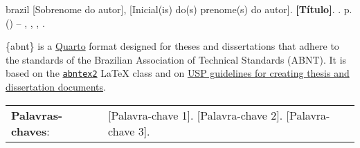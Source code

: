 \begin{resumoenv}[\resumoestrangeironame]
\begin{otherlanguage*}{brazil}
[Sobrenome do autor], [Inicial(is) do(s) prenome(s) do autor].  \textbf{[Título]}. {\imprimirdata}. {\thelastpage}p. {\imprimirtipotrabalho}  (\imprimirtituloacademico) -- {\imprimirescola}, {\imprimiruniversidade}, {\imprimirlocal}, {\imprimirdata}.


\{abnt\} is a \href{https://quarto.org}{Quarto} format designed for
theses and dissertations that adhere to the standards of the Brazilian
Association of Technical Standards (ABNT). It is based on the
\href{https://www.abntex.net.br/}{\texttt{abntex2}} LaTeX class and on
\href{https://teses.usp.br/index.php?option=com_content&view=article&id=52&Itemid=67&lang=en}{USP
guidelines for creating thesis and dissertation documents}.


\begin{tabular}{p{3.6cm} p{12.3cm}}
  \textbf{Palavras-chaves}: &  [Palavra-chave 1]. [Palavra-chave 2]. [Palavra-chave 3].
\end{tabular}
\end{otherlanguage*}
\end{resumoenv}


\listoffigures*
\cleardoublepage


\listoftables*
\cleardoublepage


